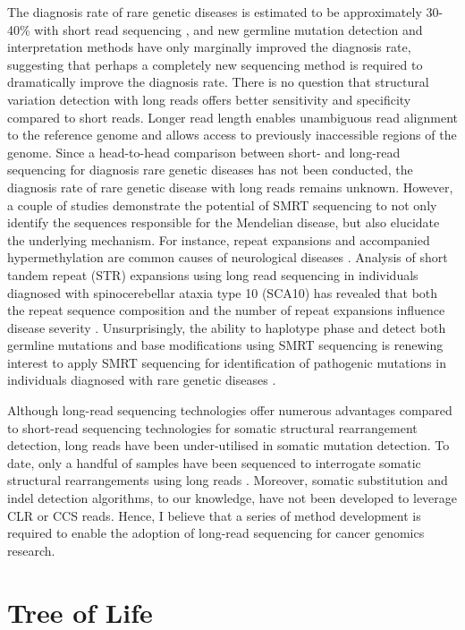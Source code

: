 The diagnosis rate of rare genetic diseases is estimated to be approximately 30-40\% with short read sequencing \cite{Wright2023-et}, and new germline mutation detection and interpretation methods have only marginally improved the diagnosis rate, suggesting that perhaps a completely new sequencing method is required to dramatically improve the diagnosis rate. There is no question that structural variation detection with long reads offers better sensitivity and specificity compared to short reads. Longer read length enables unambiguous read alignment to the reference genome and allows access to previously inaccessible regions of the genome. Since a head-to-head comparison between short- and long-read sequencing for diagnosis rare genetic diseases has not been conducted, the diagnosis rate of rare genetic disease with long reads remains unknown. However, a couple of studies demonstrate the potential of SMRT sequencing to not only identify the sequences responsible for the Mendelian disease, but also elucidate the underlying mechanism. For instance, repeat expansions and accompanied hypermethylation are common causes of neurological diseases \cite{Zhou2022-ci}. Analysis of short tandem repeat (STR) expansions using long read sequencing in individuals diagnosed with spinocerebellar ataxia type 10 (SCA10) has revealed that both the repeat sequence composition and the number of repeat expansions influence disease severity \cite{McFarland2015-qh}. Unsurprisingly, the ability to haplotype phase and detect both germline mutations and base modifications using SMRT sequencing is renewing interest to apply SMRT sequencing for identification of pathogenic mutations in individuals diagnosed with rare genetic diseases \cite{Miller2021-lt}. 

Although long-read sequencing technologies offer numerous advantages compared to short-read sequencing technologies for somatic structural rearrangement detection, long reads have been under-utilised in somatic mutation detection. To date, only a handful of samples have been sequenced to interrogate somatic structural rearrangements using long reads \cite{Nattestad2018-tr, Sakamoto2020-nq, Fujimoto2021-kc}. Moreover, somatic substitution and indel detection algorithms, to our knowledge, have not been developed to leverage CLR or CCS reads. Hence, I believe that a series of method development is required to enable the adoption of long-read sequencing for cancer genomics research.

\section{Tree of Life}

